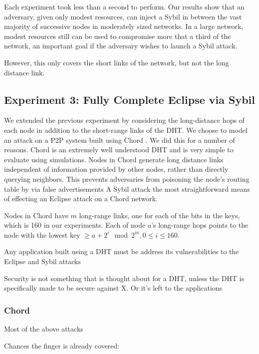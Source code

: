 \documentclass[a4paper]{IEEEtran}
\begin{document}
Each experiment took less than a second to perform.
Our results show that an adversary, given only modest resources, can inject a Sybil in between the vast majority of successive nodes in moderately sized networks.
In a large network, modest resources still can be used to compromise more that a third of the network, an  important goal if the adversary  wishes to launch a Sybil attack.

However, this only covers the short links of the network, but not the long distance link.

\subsection{Experiment 3: Fully Complete Eclipse via Sybil}
We extended the previous experiment by considering the long-distance hops of each node in addition to the short-range links of the DHT.
We choose to model an attack on a P2P system built using Chord \cite{chord}.
We did this for a number of reasons.
Chord is an extremely well understood DHT and is very simple to evaluate using simulations.
Nodes in Chord generate long distance links independent of information provided by other nodes, rather than directly querying neighbors.
This prevents adversaries from poisoning the node's routing table by via false advertisements 
A Sybil attack the most straightforward means of effecting an Eclipse attack on a Chord network.

Nodes in Chord have $m$ long-range links, one for each of the bits in the keys, which is 160 in our experiments.
Each of node $a$'s long-range hops points to the node with the lowest key $\geq a + 2^{i} \mod 2^{m} , 0 \leq i \leq 160$.






Any application built using a DHT must be address its vulnerabilities to the Eclipse and Sybil attacks

Security is not something that is thought about for a DHT, unless the 
DHT is specifically made to be secure against X.  
Or it's left to the applications



\subsubsection{Chord}
Most of the above attacks



Chances the finger is already covered:
\end{document}
